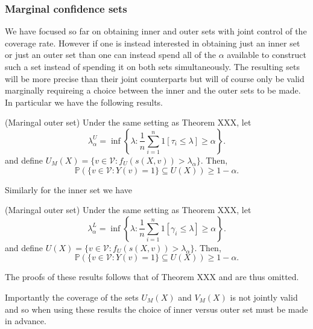 \subsubsection{Marginal confidence sets}
We have focused so far on obtaining inner and outer sets with joint control of the coverage rate. However if one is instead interested in obtaining just an inner set  or just an outer set than one can instead spend all of the $\alpha$ available to construct such a set instead of spending it on both sets simultaneously. The resulting sets will be more precise than their joint counterparts but will of course only be valid marginally requireing a choice between the inner and the outer sets to be made. In particular we have the following results. 

\begin{theorem}
	(Maringal outer set)
	Under the same setting as Theorem XXX, let 
	\begin{equation*}
		\lambda^U_{\alpha} = \inf\left\lbrace \lambda: \frac{1}{n} \sum_{i = 1}^n 1\left[ \tau_i\leq \lambda \right] \geq \alpha \right\rbrace.
	\end{equation*}
	and define $U_M(X) = \lbrace v \in \mathcal{V}: f_U(s(X,v)) > \lambda_{\alpha} \rbrace $. Then,
	\begin{equation}\label{eq:probstat}
		\mathbb{P}\left( \lbrace v\in \mathcal{V}: Y(v) = 1 \rbrace \subseteq U(X) \right) \geq 1 - \alpha.
	\end{equation}
\end{theorem}
Similarly for the inner set we have
\begin{theorem}
	(Maringal outer set)
	Under the same setting as Theorem XXX, let 
	\begin{equation*}
		\lambda^L_{\alpha} = \inf\left\lbrace \lambda: \frac{1}{n} \sum_{i = 1}^n 1\left[ \gamma_i\leq \lambda \right] \geq \alpha \right\rbrace.
	\end{equation*}
	and define $U(X) = \lbrace v \in \mathcal{V}: f_U(s(X,v)) > \lambda_{\alpha} \rbrace $. Then,
	\begin{equation}\label{eq:probstat}
		\mathbb{P}\left( \lbrace v\in \mathcal{V}: Y(v) = 1 \rbrace \subseteq U(X) \right) \geq 1 - \alpha.
	\end{equation}
\end{theorem}
The proofs of these results follows that of Theorem XXX and are thus omitted. 
\begin{remark}
	Importantly the coverage of the sets $U_M(X)$ and $V_M(X)$ is not jointly valid and so when using these results the choice of inner versus outer set must be made in advance.
\end{remark}

